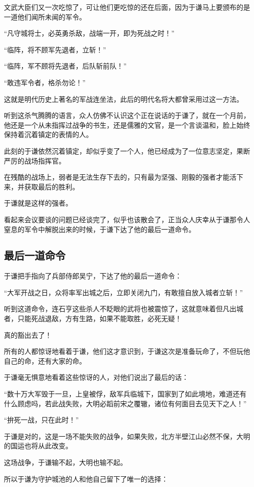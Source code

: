 \begin{multicols}{\theparacolNo}
文武大臣们又一次吃惊了，可让他们更吃惊的还在后面，因为于谦马上要颁布的是一道他们闻所未闻的军令。

“凡守城将士，必英勇杀敌，战端一开，即为死战之时！”

“临阵，将不顾军先退者，立斩！”

“临阵，军不顾将先退者，后队斩前队！”

“敢违军令者，格杀勿论！”

这就是明代历史上著名的军战连坐法，此后的明代名将大都曾采用过这一方法。

听到这杀气腾腾的语言，众人仿佛不认识这个正在说话的于谦了，就在一个月前，他还是一个从未指挥过战争的书生，还是儒雅的文官，是一个言谈温和，脸上始终保持着沉着镇定的表情的人。

此刻的于谦依然沉着镇定，却似乎变了一个人，他已经成为了一位意志坚定，果断严厉的战场指挥官。

在残酷的战场上，弱者是无法生存下去的，只有最为坚强、刚毅的强者才能活下来，并获取最后的胜利。

于谦就是这样的强者。

看起来会议要谈的问题已经谈完了，似乎也该散会了，正当众人庆幸从于谦那令人窒息的军令中解脱出来的时候，于谦下达了他的最后一道命令。

\subsection{最后一道命令}
于谦把手指向了兵部侍郎吴宁，下达了他的最后一道命令：

“大军开战之日，众将率军出城之后，立即关闭九门，有敢擅自放入城者立斩！”

听到这道命令，连石亨这些杀人不眨眼的武将也被震惊了，这就意味着但凡出城者，只能死战退敌，方有生路，如果不能取胜，必死无疑！

真的豁出去了！

所有的人都惊讶地看着于谦，他们这才意识到，于谦这次是准备玩命了，不但玩他自己的命，还有大家的命。

于谦毫无惧意地看着这些惊讶的人，对他们说出了最后的话：

“数十万大军毁于一旦，上皇被俘，敌军兵临城下，国家到了如此境地，难道还有什么顾虑吗，若此战失败，大明必蹈前宋之覆辙，诸位有何面目去见天下之人！”

“拚死一战，只在此时！”

于谦是对的，这是一场不能失败的战争，如果失败，北方半壁江山必然不保，大明的国运也将从此改变。

这场战争，于谦输不起，大明也输不起。

所以于谦为守护城池的人和他自己留下了唯一的选择：


\end{multicols}
